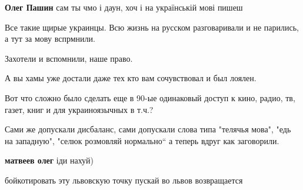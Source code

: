 \begin{itemize}
\begin{itemize}
 
\textbf{Олег Пашин} сам ты чмо і даун, хоч і на українській мові пишеш
\end{itemize}


Все такие щирые украинцы. Всю жизнь на русском разговаривали и не парились, а тут за мову вспрмнили.

\begin{itemize}
 

Захотели и вспомнили, наше право.

А вы хамы уже достали даже тех кто вам сочувствовал и был лоялен.

Вот что сложно было сделать еще в 90-ые одинаковый доступ к кино, радио, тв,
газет, книг и для украиноязычных в т.ч.?

Сами же допускали дисбаланс, сами допускали слова типа "телячья мова", "едь на
западную", "селюк розмовляй нормально“ а теперь вдруг как заговорили.


 
\textbf{матвеев олег} іди нахуй)
\end{itemize}

 
бойкотировать эту львовскую точку пускай во львов возвращается

\begin{itemize}
 

\end{itemize}
\end{itemize}

